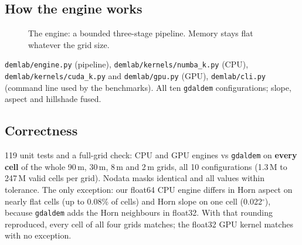 ﻿\documentclass[11pt,a4paper]{article}
\newcommand{\code}[1]{\texttt{#1}}
\begin{document}
\subsection{How the engine works}
\begin{figure}[!htbp]
\centering
{}
\caption{The engine: a bounded three-stage pipeline. Memory stays flat whatever the grid size.}
\end{figure}
\code{demlab/engine.py} (pipeline), \code{demlab/kernels/numba\_k.py} (CPU), \code{demlab/kernels/cuda\_k.py} and
\code{demlab/gpu.py} (GPU), \code{demlab/cli.py} (command line used by the benchmarks). All ten \code{gdaldem}
configurations; slope, aspect and hillshade fused.

\subsection{Correctness}
119 unit tests and a full-grid check: CPU and GPU engines vs \code{gdaldem} on \textbf{every cell} of the whole 90\,m,
30\,m, 8\,m and 2\,m grids, all 10 configurations (1.3\,M to 247\,M valid cells per grid). Nodata masks identical and all
values within tolerance. The only exception: our float64 CPU engine differs in Horn aspect on nearly flat cells (up to
0.08\% of cells) and Horn slope on one cell (0.022$^\circ$), because \code{gdaldem} adds the Horn neighbours in float32.
With that rounding reproduced, every cell of all four grids matches; the float32 GPU kernel matches with no exception.
\end{document}
